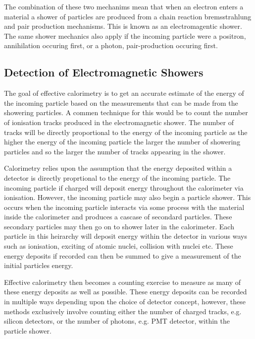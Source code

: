 The combination of these two mechanims mean that when an electron enters a material a shower of particles are produced from a chain reaction bremsstrahlung and pair production mechanisms.  This is known as an electromagentic shower.  The same shower mechanics also apply if the incoming particle were a positron, annihilation occuring first, or a photon, pair-production occuring first.  

\subsection{Detection of Electromagnetic Showers}
The goal of effective calorimetry is to get an accurate estimate of the energy of the incoming particle based on the measurements that can be made from the showering particles.  A commen technique for this would be to count the number of ionisation tracks produced in the electromagnetic shower.  The number of tracks will be directly proportional to the energy of the incoming particle as the higher the energy of the incoming particle the larger the number of showering particles and so the larger the number of tracks appearing in the shower.  




Calorimetry relies upon the assumption that the energy deposited within a detector is directly proprtional to the energy of the incoming particle.  The incoming particle if charged will deposit energy throughout the calorimeter via ionisation.  However, the incoming particle may also begin a particle shower.  This occurs when the incoming particle interacts via some process with the material inside the calorimeter and produces a cascase of secondard particles.  These secondary particles may then go on to shower later in the calorimeter.  Each particle in this heirarchy will deposit energy within the detector in various ways such as ionisation, exciting of atomic nuclei, collision with nuclei etc.  These energy deposits if recorded can then be summed to give a measurement of the initial particles energy.

Effective calorimetry then becomes a counting exercise to measure as many of these energy deposits as well as possible.  These energy deposits can be recorded in multiple ways depending upon the choice of detector concept, however, these methods exclusively involve counting either the number of charged tracks, e.g. silicon detectors, or the number of photons, e.g. PMT detector, within the particle shower.

